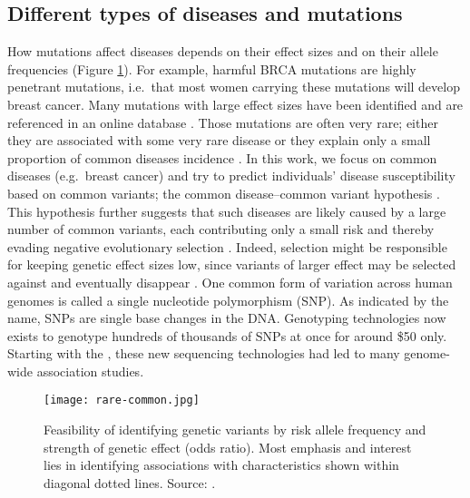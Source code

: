 \subsection{Different types of diseases and mutations}

How mutations affect diseases depends on their effect sizes and on their allele frequencies (Figure \ref{fig:rare-common}).
For example, harmful BRCA mutations are highly penetrant mutations, i.e.\ that most women carrying these mutations will develop breast cancer. Many mutations with large effect sizes have been identified and are referenced in an online database \cite[]{hamosh2005online}. 
Those mutations are often very rare; either they are associated with some very rare disease or they explain only a small proportion of common diseases incidence \cite[]{anglian2000prevalence}.
In this work, we focus on common diseases (e.g.\ breast cancer) and try to predict individuals' disease susceptibility based on common variants; the common disease--common variant hypothesis \cite[]{pritchard2002allelic}. This hypothesis further suggests that such diseases are likely caused by a large number of common variants, each contributing only a small risk and thereby evading negative evolutionary selection \cite[]{salari2012personalized}.
Indeed, selection might be responsible for keeping genetic effect sizes low, since variants of larger effect may be selected against and eventually disappear \cite[]{pritchard2002allelic}.
One common form of variation across human genomes is called a single nucleotide polymorphism (SNP). As indicated by the name, SNPs are single base changes in the DNA.
Genotyping technologies now exists to genotype hundreds of thousands of SNPs at once for around \$50 only. Starting with the \cite{wellcome2007genome}, these new sequencing technologies had led to many genome-wide association studies.%

\begin{figure}[htb]
\centerline{\texttt{[image: rare-common.jpg]}}
\caption{Feasibility of identifying genetic variants by risk allele frequency and strength of genetic effect (odds ratio). Most emphasis and interest lies
in identifying associations with characteristics shown within diagonal dotted
lines. Source: \cite{manolio2009finding}.}
\label{fig:rare-common}
\end{figure}


